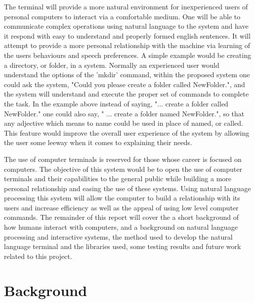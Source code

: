 \documentclass[12pt]{article}
\begin{document}
The terminal will provide a more natural environment for inexperienced users of personal computers to interact via a comfortable medium. One will be able to communicate complex operations using natural language to the system and have it respond with easy to understand and properly formed english sentences. It will attempt to provide a more personal relationship with the machine via learning of the users behaviours and speech preferences.\cite{ogden} A simple example would be creating a directory, or folder, in a system. Normally an experienced user would understand the options of the 'mkdir' command, within the proposed system one could ask the system, "Could you please create a folder called NewFolder.", and the system will understand and execute the proper set of commands to complete the task. In the example above instead of saying, "... create a folder called NewFolder." one could also say, " ... create a folder named NewFolder.", so that any adjective which means to name could be used in place of named, or called. This feature would improve the overall user experience of the system by allowing the user some leeway when it comes to explaining their needs.\cite{kelly}

The use of computer terminals is reserved for those whose career is focused on computers. The objective of this system would be to open the use of computer terminals and their capabilities to the general public while building a more personal relationship and easing the use of these systems. Using natural language processing this system will allow the computer to build a relationship with its users and increase efficiency as well as the appeal of using low level computer commands. The remainder of this report will cover the a short background of how humans interact with computers, and a background on natural language processing and interactive systems, the method used to develop the natural language terminal and the libraries used, some testing results and future work related to this project.

\section{Background}
\end{document}

